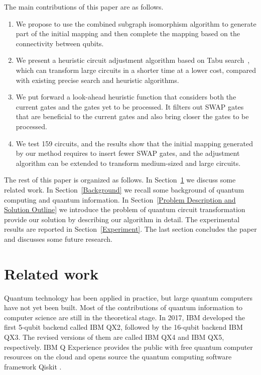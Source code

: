 \documentclass[journal]{IEEEtran}
\begin{document}
The main contributions of this paper are as follows.
	\begin{enumerate}
	\item We propose to use the combined subgraph isomorphism algorithm to generate part of the initial mapping
    and then complete the mapping based on the connectivity between qubits.
	\item We present a heuristic circuit adjustment algorithm based on Tabu search~\cite{Glover1990}, which can transform large circuits in a shorter time at a lower cost, compared with existing precise search and heuristic algorithms.
	\item  We put forward a look-ahead heuristic function that considers both the current gates and the  gates yet to be processed. It filters out SWAP gates that are beneficial to the current gates and also bring closer the gates to be processed.
	\item We test 159 circuits, and the results show that the initial mapping generated by our method requires to insert fewer SWAP gates, and the adjustment algorithm can be extended to transform medium-sized and large circuits.
	\end{enumerate}

The rest of this paper is organized as follows.
In Section~\ref{Related work} we discuss some related work. 
In Section~\ref{Background} we recall some background of quantum computing and quantum information. In Section~\ref{Problem Description and Solution Outline}
we introduce the problem of  quantum circuit transformation provide our solution by describing our algorithm in detail.
The experimental results are reported in Section~\ref{Experiment}. 
The last section concludes the paper and discusses some future research.


\section{Related work}
\label{Related work}
Quantum technology has been applied in practice, but large quantum computers have not yet been built. Most of the contributions of quantum information to computer science are still in the theoretical stage. In 2017, IBM developed the first 5-qubit backend called IBM QX2, followed by the 16-qubit backend  IBM QX3. The revised versions of them are called IBM QX4 and IBM QX5, respectively. IBM Q Experience \cite{ibm} provides the public with free quantum computer resources on the cloud and opens source the quantum computing software framework Qiskit \cite{qiskit}. 
\end{document}
